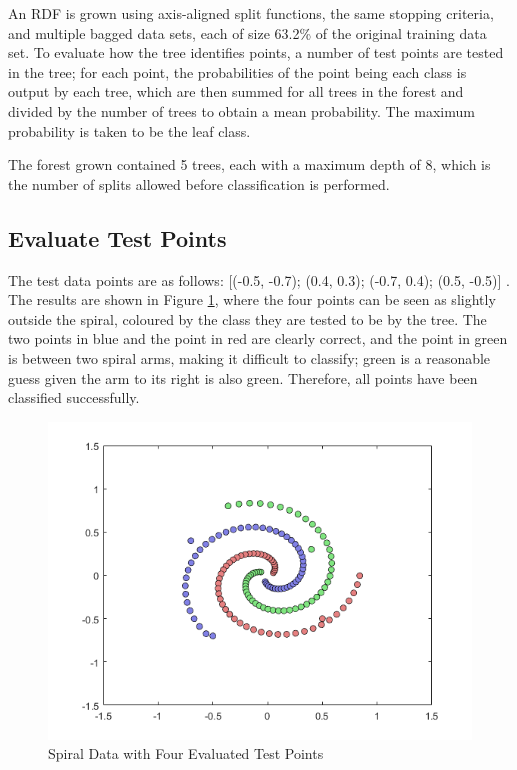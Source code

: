 \documentclass[a4paper, 10pt, conference]{ieeeconf}
\begin{document}
An RDF is grown using axis-aligned split functions, the same stopping criteria, and multiple bagged data sets, each of size 63.2\% of the original training data set. To evaluate how the tree identifies points, a number of test points are tested in the tree; for each point, the probabilities of the point being each class is output by each tree, which are then summed for all trees in the forest and divided by the number of trees to obtain a mean probability. The maximum probability is taken to be the leaf class.

The forest grown contained 5 trees, each with a maximum depth of 8, which is the number of splits allowed before classification is performed.

\subsection{Evaluate Test Points}

The test data points are as follows: [(-0.5, -0.7); (0.4, 0.3); (-0.7, 0.4); (0.5, -0.5)] \cite{instructions}. The results are shown in Figure \ref{fig:test_points}, where the four points can be seen as slightly outside the spiral, coloured by the class they are tested to be by the tree. The two points in blue and the point in red are clearly correct, and the point in green is between two spiral arms, making it difficult to classify; green is a reasonable guess given the arm to its right is also green. Therefore, all points have been classified successfully.

\begin{figure}[!ht]
  \centering
  \includegraphics[width=\linewidth]{img/test_points}
  \caption{Spiral Data with Four Evaluated Test Points}
  \label{fig:test_points}
\end{figure}
\end{document}
